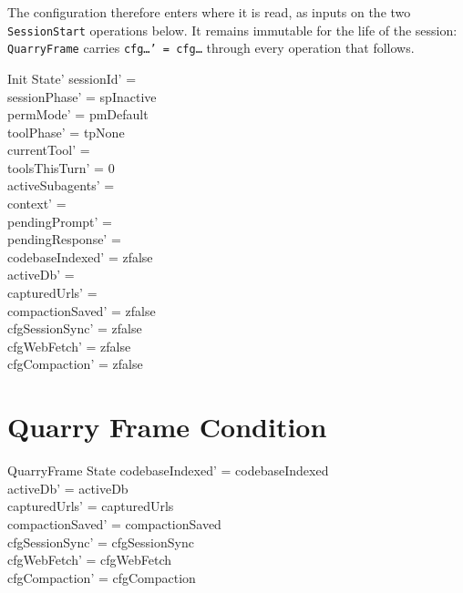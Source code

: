 \documentclass[a4paper,10pt,fleqn]{article}
\begin{document}
The configuration therefore enters where it is read, as inputs on the two
\texttt{SessionStart} operations below. It remains immutable for the life
of the session: \texttt{QuarryFrame} carries \texttt{cfg\ldots' =
cfg\ldots} through every operation that follows.

\begin{schema}{Init}
  State'
  \where
  sessionId' = \emptyset \\
  sessionPhase' = spInactive \\
  permMode' = pmDefault \\
  toolPhase' = tpNone \\
  currentTool' = \emptyset \\
  toolsThisTurn' = 0 \\
  activeSubagents' = \emptyset \\
  context' = \langle \rangle \\
  pendingPrompt' = \emptyset \\
  pendingResponse' = \emptyset \\
  codebaseIndexed' = zfalse \\
  activeDb' = \emptyset \\
  capturedUrls' = \emptyset \\
  compactionSaved' = zfalse \\
  cfgSessionSync' = zfalse \\
  cfgWebFetch' = zfalse \\
  cfgCompaction' = zfalse
\end{schema}

\section{Quarry Frame Condition}

\begin{schema}{QuarryFrame}
  \Delta State
  \where
  codebaseIndexed' = codebaseIndexed \\
  activeDb' = activeDb \\
  capturedUrls' = capturedUrls \\
  compactionSaved' = compactionSaved \\
  cfgSessionSync' = cfgSessionSync \\
  cfgWebFetch' = cfgWebFetch \\
  cfgCompaction' = cfgCompaction
\end{schema}
\end{document}
